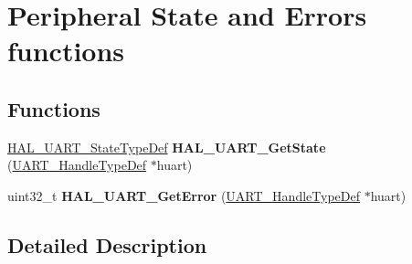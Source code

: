 \hypertarget{group___u_a_r_t___exported___functions___group4}{\section{Peripheral State and Errors functions}
\label{group___u_a_r_t___exported___functions___group4}
}
\subsection*{Functions}
\begin{DoxyCompactItemize}
\item 
\hypertarget{group___u_a_r_t___exported___functions___group4_ga8fcec96f9d249f41ecf0c7598ab421e5}{\hyperlink{group___u_a_r_t___exported___types_gaf55d844a35379c204c90be5d1e8e50ba}{H\-A\-L\-\_\-\-U\-A\-R\-T\-\_\-\-State\-Type\-Def} {\bfseries H\-A\-L\-\_\-\-U\-A\-R\-T\-\_\-\-Get\-State} (\hyperlink{struct_u_a_r_t___handle_type_def}{U\-A\-R\-T\-\_\-\-Handle\-Type\-Def} $\ast$huart)}\label{group___u_a_r_t___exported___functions___group4_ga8fcec96f9d249f41ecf0c7598ab421e5}

\item 
\hypertarget{group___u_a_r_t___exported___functions___group4_ga6c5f93a76a0bd01ad2d1351adddfa63f}{uint32\-\_\-t {\bfseries H\-A\-L\-\_\-\-U\-A\-R\-T\-\_\-\-Get\-Error} (\hyperlink{struct_u_a_r_t___handle_type_def}{U\-A\-R\-T\-\_\-\-Handle\-Type\-Def} $\ast$huart)}\label{group___u_a_r_t___exported___functions___group4_ga6c5f93a76a0bd01ad2d1351adddfa63f}

\end{DoxyCompactItemize}


\subsection{Detailed Description}
